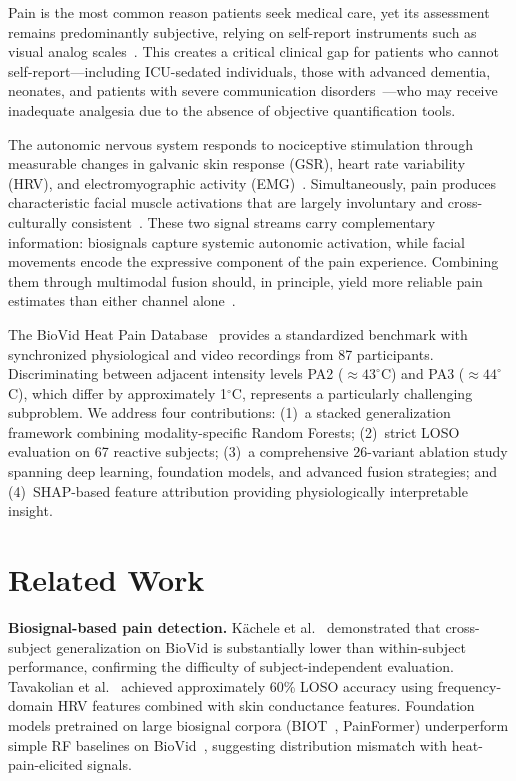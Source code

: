 \documentclass[sigconf]{acmart}
\begin{document}
Pain is the most common reason patients seek medical care, yet its assessment
remains predominantly subjective, relying on self-report instruments such as
visual analog scales~\cite{jensen2003}. This creates a critical clinical gap
for patients who cannot self-report---including ICU-sedated individuals, those
with advanced dementia, neonates, and patients with severe communication
disorders~\cite{puntillo2004,lichtner2014}---who may receive inadequate
analgesia due to the absence of objective quantification tools.

The autonomic nervous system responds to nociceptive stimulation through
measurable changes in galvanic skin response (GSR), heart rate variability
(HRV), and electromyographic activity (EMG)~\cite{loggia2011}. Simultaneously,
pain produces characteristic facial muscle activations that are largely
involuntary and cross-culturally consistent~\cite{ekman1978,prkachin2008}.
These two signal streams carry complementary information: biosignals capture
systemic autonomic activation, while facial movements encode the expressive
component of the pain experience. Combining them through multimodal fusion
should, in principle, yield more reliable pain estimates than either channel
alone~\cite{werner2017}.

The BioVid Heat Pain Database~\cite{walter2013} provides a standardized
benchmark with synchronized physiological and video recordings from 87
participants. Discriminating between adjacent intensity levels PA2
($\approx 43^\circ$C) and PA3 ($\approx 44^\circ$C), which differ by
approximately 1$^\circ$C, represents a particularly challenging subproblem.
We address four contributions: (1)~a stacked generalization framework combining
modality-specific Random Forests; (2)~strict LOSO evaluation on 67 reactive
subjects; (3)~a comprehensive 26-variant ablation study spanning deep learning,
foundation models, and advanced fusion strategies; and (4)~SHAP-based feature
attribution providing physiologically interpretable insight.

\section{Related Work}
\label{sec:related}

\textbf{Biosignal-based pain detection.}
Kächele et al.~\cite{kachele2016} demonstrated that cross-subject
generalization on BioVid is substantially lower than within-subject
performance, confirming the difficulty of subject-independent evaluation.
Tavakolian et al.~\cite{tavakolian2020} achieved approximately 60\%
LOSO accuracy using frequency-domain HRV features combined with skin
conductance features. Foundation models pretrained on large biosignal
corpora (BIOT~\cite{yang2023}, PainFormer) underperform simple RF baselines
on BioVid~\cite{gkikas2023}, suggesting distribution mismatch with
heat-pain-elicited signals.
\end{document}

